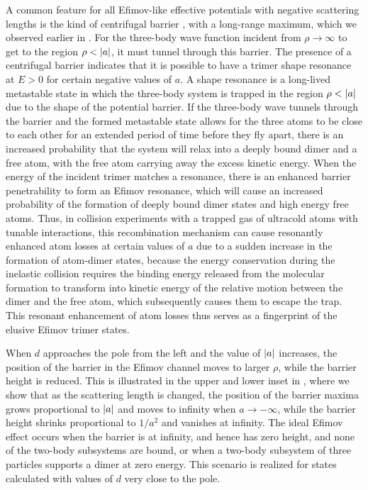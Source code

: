 A common feature for all Efimov-like effective potentials with negative scattering lengths is the kind of centrifugal barrier \cite{EsryGreenBurke1999}, with a long-range maximum, which we observed earlier in . For the three-body wave function incident from $\rho \rightarrow \infty$ to get to the region $\rho<\lvert a\rvert$, it must tunnel through this barrier. The presence of a centrifugal barrier indicates that it is possible to have a trimer shape resonance at $E>0$ for certain negative values of $a$. A shape resonance is a long-lived metastable state in which the three-body system is trapped in the region $\rho<\lvert a\rvert$ due to the shape of the potential barrier. If the three-body wave tunnels through the barrier and the formed metastable state allows for the three atoms to be close to each other for an extended period of time before they fly apart, there is an increased probability that the system will relax into a deeply bound dimer and a free atom, with the free atom carrying away the excess kinetic energy. When the energy of the incident trimer matches a resonance, there is an enhanced barrier penetrability to form an Efimov resonance, which will cause an increased probability of the formation of deeply bound dimer states and high energy free atoms. Thus, in collision experiments with a trapped gas of ultracold atoms with tunable interactions, this recombination mechanism can cause resonantly enhanced atom losses at certain values of $a$ due to a sudden increase in the formation of atom-dimer states, because the energy conservation during the inelastic collision requires the binding energy released from the molecular formation to transform into kinetic energy of the relative motion between the dimer and the free atom, which subsequently causes them to escape the trap. This resonant enhancement of atom losses thus serves as a fingerprint of the elusive Efimov trimer states. 

When $d$ approaches the pole from the left and the value of $\lvert a\rvert$ increases, the position of the barrier in the Efimov channel moves to larger $\rho$, while the barrier height is reduced. This is illustrated in the upper and lower inset in , where we show that as the scattering length is changed, the position of the barrier maxima grows proportional to $\lvert a\rvert$ and moves to infinity when $a \rightarrow -\infty$, while the barrier height shrinks proportional to $1/a^2$ and vanishes at infinity. The ideal Efimov effect occurs when the barrier is at infinity, and hence has zero height, and none of the two-body subsystems are bound, or when a two-body subsystem of three particles supports a dimer at zero energy. This scenario is realized for states calculated with values of $d$ very close to the pole. 

